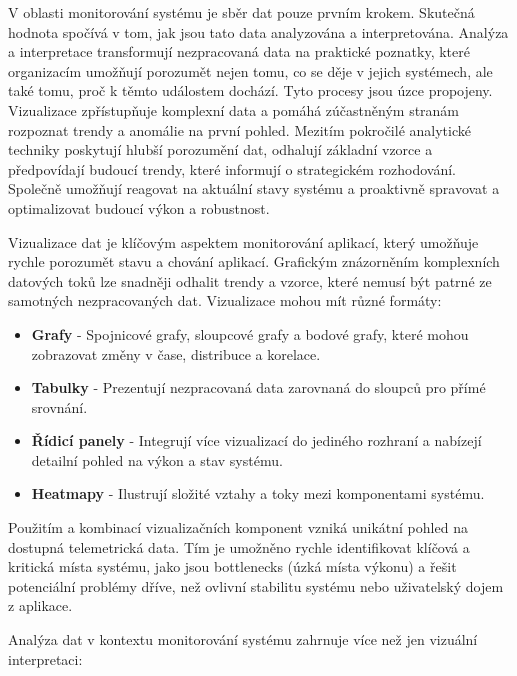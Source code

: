 
V oblasti monitorování systému je sběr dat pouze prvním krokem. Skutečná hodnota spočívá v tom, jak jsou tato data analyzována a interpretována. Analýza a interpretace transformují nezpracovaná data na praktické poznatky, které organizacím umožňují porozumět nejen tomu, co se děje v jejich systémech, ale také tomu, proč k těmto událostem dochází. Tyto procesy jsou úzce propojeny. Vizualizace zpřístupňuje komplexní data a pomáhá zúčastněným stranám rozpoznat trendy a anomálie na první pohled. Mezitím pokročilé analytické techniky poskytují hlubší porozumění dat, odhalují základní vzorce a předpovídají budoucí trendy, které informují o strategickém rozhodování. Společně umožňují reagovat na aktuální stavy systému a proaktivně spravovat a optimalizovat budoucí výkon a robustnost. \cite{Majors2022}


Vizualizace dat je klíčovým aspektem monitorování aplikací, který umožňuje rychle porozumět stavu a chování aplikací. Grafickým znázorněním komplexních datových toků lze snadněji odhalit trendy a vzorce, které nemusí být patrné ze samotných nezpracovaných dat. Vizualizace mohou mít různé formáty:

\begin{itemize}
    \item \textbf{Grafy} - Spojnicové grafy, sloupcové grafy a bodové grafy, které mohou zobrazovat změny v čase, distribuce a korelace.
    \item \textbf{Tabulky} - Prezentují nezpracovaná data zarovnaná do sloupců pro přímé srovnání.
    \item \textbf{Řídicí panely} - Integrují více vizualizací do jediného rozhraní a nabízejí detailní pohled na výkon a stav systému.
    \item \textbf{Heatmapy} - Ilustrují složité vztahy a toky mezi komponentami systému.
\end{itemize}

Použitím a kombinací vizualizačních komponent vzniká unikátní pohled na dostupná telemetrická data. Tím je umožněno rychle identifikovat klíčová a kritická místa systému, jako jsou bottlenecks (úzká místa výkonu) a řešit potenciální problémy dříve, než ovlivní stabilitu systému nebo uživatelský dojem z aplikace.


Analýza dat v kontextu monitorování systému zahrnuje více než jen vizuální interpretaci:

